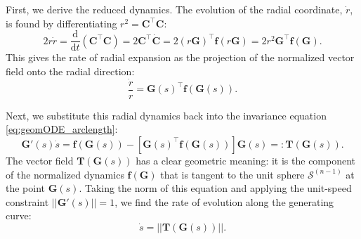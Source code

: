 \documentclass[a4paper,9pt,parskip=half,english]{article}
\theoremstyle{plain}
\theoremstyle{definition}
\newcommand{\T}{^{\!\top}} %
\newcommand{\vf}{\mathbf f}
\newcommand{\vC}{\mathbf C}
\newcommand{\vG}{\mathbf G}
\newcommand{\vT}{\mathbf T}
\begin{document}
First, we derive the reduced dynamics. The evolution of the radial coordinate, $\dot{r}$, is found by differentiating $r^2 = \vC\T\vC$:
\begin{equation}
	2r\dot{r} = \frac{\mathrm{d}}{\mathrm{d}t}(\vC\T\vC) = 2\vC\T\dot{\vC} = 2(r\vG)\T \vf(r\vG) = 2r^2 \vG\T\vf(\vG).
\end{equation}
This gives the rate of radial expansion as the projection of the normalized vector field onto the radial direction:
\begin{equation}\label{eq:radial_dynamics}
	\frac{\dot{r}}{r} = \vG(s)\T\vf(\vG(s)).
\end{equation}

Next, we substitute this radial dynamics back into the invariance equation \eqref{eq:geomODE_arclength}:
\begin{equation}\label{eq:definitionT}
	\vG'(s)\dot{s} = \vf(\vG(s)) - \left[ \vG(s)\T \vf(\vG(s)) \right] \vG(s) =: \vT(\vG(s)).
\end{equation}
The vector field $\vT(\vG(s))$ has a clear geometric meaning: it is the component of the normalized dynamics $\vf(\vG)$ that is tangent to the unit sphere $\mathcal{S}^{(n-1)}$ at the point $\vG(s)$. Taking the norm of this equation and applying the unit-speed constraint $||\vG'(s)||=1$, we find the rate of evolution along the generating curve:
\begin{equation}\label{eq:arclength_dynamics}
	\dot{s} = ||\vT(\vG(s))||.
\end{equation}
\end{document}
